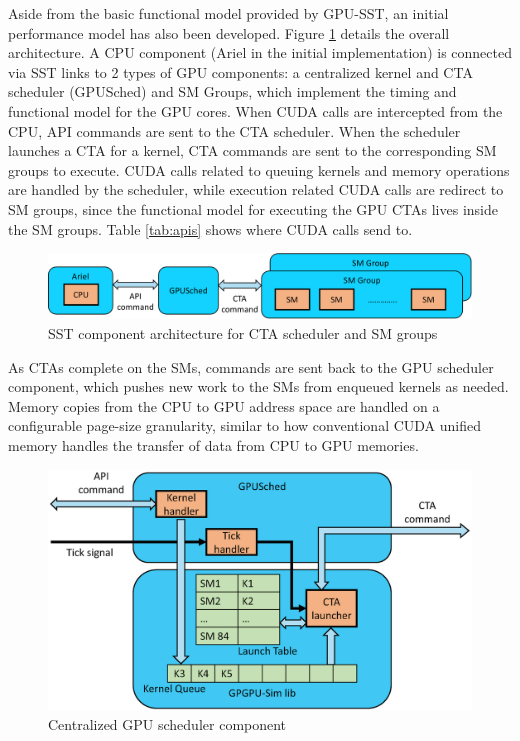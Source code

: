 Aside from the basic functional model provided by GPU-SST, an initial
performance model has also been developed. Figure \ref{fig:gpu_sched} details
the overall architecture. A CPU component (Ariel in the initial implementation)
is connected via SST links to 2 types of GPU components: a centralized kernel and
CTA scheduler (GPUSched) and SM Groups, which implement the timing
and functional model for the GPU cores. When CUDA calls are intercepted
from the CPU, API commands are sent to the CTA scheduler. When the scheduler
launches a CTA for a kernel, CTA commands are sent to the corresponding SM groups
to execute. CUDA calls related to queuing kernels and memory operations are
handled by the scheduler, while execution related CUDA calls are redirect
to SM groups, since the functional model for executing the GPU CTAs lives inside
the SM groups. Table \ref{tab:apis} shows where CUDA calls send to. 

   \begin{figure}[!htb]
      \centering
      \setlength{\abovecaptionskip}{6pt plus 1pt minus 1pt}
      \includegraphics[width=.90\textwidth,keepaspectratio]{figures/2_1-eps-converted-to-crop.pdf}
      \captionsetup{width=.90\textwidth}
      \caption{SST component architecture for CTA scheduler and SM groups}
      \label{fig:gpu_sched}
   \end{figure}


As CTAs complete on the SMs, commands are sent back to the GPU scheduler
component, which pushes new work to the SMs from enqueued kernels as needed.
Memory copies from the CPU to GPU address space are handled on a configurable
page-size granularity, similar to how conventional CUDA unified memory handles
the transfer of data from CPU to GPU memories.

   \begin{figure}[!htb]
      \centering
      \setlength{\abovecaptionskip}{6pt plus 1pt minus 1pt}
      \includegraphics[width=.90\textwidth,keepaspectratio]{figures/scheduler.eps}
      \captionsetup{width=.75\textwidth}
      \caption{Centralized GPU scheduler component}
      \label{fig:sched}
   \end{figure}

